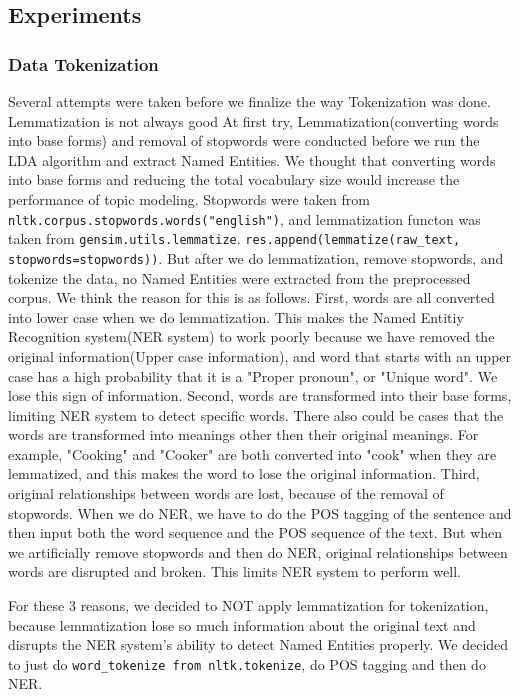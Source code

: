\subsection{Experiments}
\subsubsection{Data Tokenization}
Several attempts were taken before we finalize the way Tokenization was done. Lemmatization is not always good
At first try, Lemmatization(converting words into base forms) and removal of stopwords were conducted before we run the LDA algorithm and extract Named Entities. We thought that converting words into base forms and reducing the total vocabulary size would increase the performance of topic modeling. Stopwords were taken from \texttt{nltk.corpus.stopwords.words("english")}, and lemmatization functon was taken from \texttt{gensim.utils.lemmatize}. \texttt{res.append(lemmatize(raw\_text, stopwords=stopwords))}. But after we do lemmatization, remove stopwords, and tokenize the data, no Named Entities were extracted from the preprocessed corpus. We think the reason for this is as follows. 
First, words are all converted into lower case when we do lemmatization. This makes the Named Entitiy Recognition system(NER system) to work poorly because we have removed the original information(Upper case information), and word that starts with an upper case has a high probability that it is a "Proper pronoun", or "Unique word". We lose this sign of information.
Second, words are transformed into their base forms, limiting NER system to detect specific words. There also could be cases that the words are transformed into meanings other then their original meanings. For example, "Cooking" and "Cooker" are both converted into "cook" when they are lemmatized, and this makes the word to lose the original information.
Third, original relationships between words are lost, because of the removal of stopwords. When we do NER, we have to do the POS tagging of the sentence and then input both the word sequence and the POS sequence of the text. But when we artificially remove stopwords and then do NER, original relationships between words are disrupted and broken. This limits NER system to perform well.

For these 3 reasons, we decided to NOT apply lemmatization for tokenization, because lemmatization lose so much information about the original text and disrupts the NER system's ability to detect Named Entities properly. We decided to just do \texttt{word_tokenize from nltk.tokenize}, do POS tagging and then do NER.


